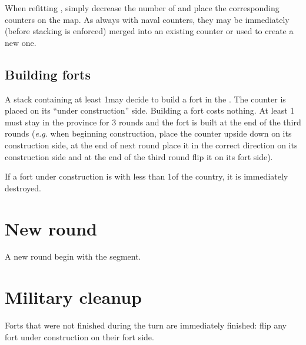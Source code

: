When refitting \ND, simply decrease the number of  \ND and
place the corresponding counters on the map. As always with naval counters,
they may be immediately (before stacking is enforced) merged into an existing
\FLEET counter or used to create a new one.

\subsection{Building forts}
A stack containing at least 1\LD may decide to build a fort in the \ROTW. The
counter is placed on its ``under construction'' side. Building a fort costs
nothing. At least 1 \LD must stay in the province for 3 rounds and the fort is
built at the end of the third rounds (\emph{e.g.} when beginning construction,
place the counter upside down on its construction side, at the end of next
round place it in the correct direction on its construction side and at the
end of the third round flip it on its fort side).

If a fort under construction is with less than 1\LD of the country, it is
immediately destroyed.

\section{New round}
A new round begin with the  segment.

\section{Military cleanup}
\label{chMilitary:cleanup}
Forts that were not finished during the turn are immediately finished: flip
any fort under construction on their fort side.

